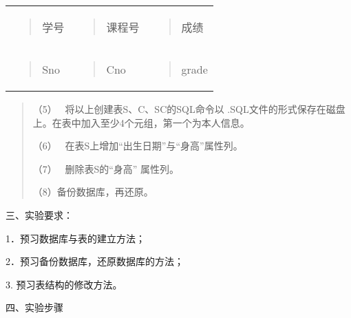 \documentclass[
]{article}
\begin{document}
\begin{longtable}[]{@{}lll@{}}
\toprule
\endhead
\begin{minipage}[t]{0.30\columnwidth}\raggedright
\begin{quote}
学号
\end{quote}\strut
\end{minipage} & \begin{minipage}[t]{0.30\columnwidth}\raggedright
\begin{quote}
课程号
\end{quote}\strut
\end{minipage} & \begin{minipage}[t]{0.30\columnwidth}\raggedright
\begin{quote}
成绩
\end{quote}\strut
\end{minipage}\tabularnewline
\begin{minipage}[t]{0.30\columnwidth}\raggedright
\begin{quote}
Sno
\end{quote}\strut
\end{minipage} & \begin{minipage}[t]{0.30\columnwidth}\raggedright
\begin{quote}
Cno
\end{quote}\strut
\end{minipage} & \begin{minipage}[t]{0.30\columnwidth}\raggedright
\begin{quote}
grade
\end{quote}\strut
\end{minipage}\tabularnewline
\bottomrule
\end{longtable}

\begin{quote}
（5）~ 将以上创建表S、C、SC的SQL命令以
.SQL文件的形式保存在磁盘上。在表中加入至少4个元组，第一个为本人信息。

（6）~ 在表S上增加``出生日期''与``身高''属性列。

（7）~ 删除表S的``身高'' 属性列。

（8）备份数据库，再还原。
\end{quote}

三、实验要求：

1．预习数据库与表的建立方法；

2．预习备份数据库，还原数据库的方法；

3. 预习表结构的修改方法。

四、实验步骤
\end{document}
